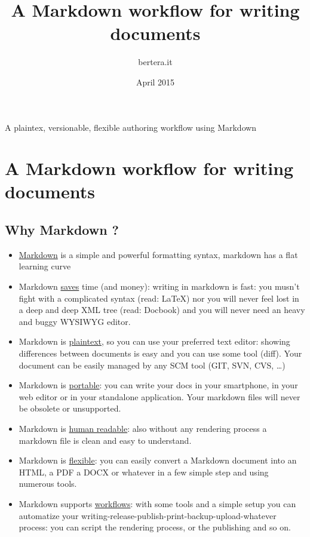 \documentclass[	DIV=calc,%
							paper=a4,%
							fontsize=10pt]{scrartcl}	 					%
\title{A Markdown workflow for writing documents}
\author{bertera.it}
\date{April 2015}
\renewenvironment{abstract}
  {\begin{tcolorbox}[colframe=myblue,colback=mygraylight]}
  {\end{tcolorbox}}
\begin{document}
\maketitle
\begin{abstract}
A plaintex, versionable, flexible authoring workflow using Markdown
\end{abstract}


\thispagestyle{fancy} 			%

\section{A Markdown workflow for writing
documents}\label{a-markdown-workflow-for-writing-documents}

\subsection{Why Markdown ?}\label{why-markdown}

\begin{itemize}
\item
  \href{http://en.wikipedia.org/wiki/Markdown}{Markdown} is a simple and
  powerful formatting syntax, markdown has a flat learning curve
\item
  Markdown
  \href{http://brettterpstra.com/2011/08/31/why-markdown-a-two-minute-explanation/}{saves}
  time (and money): writing in markdown is fast: you musn't fight with a
  complicated syntax (read: LaTeX) nor you will never feel lost in a
  deep and deep XML tree (read: Docbook) and you will never need an
  heavy and buggy WYSIWYG editor.
\item
  Markdown is
  \href{https://help.github.com/articles/markdown-basics/}{plaintext},
  so you can use your preferred text editor: showing differences between
  documents is easy and you can use some tool (diff). Your document can
  be easily managed by any SCM tool (GIT, SVN, CVS, \ldots{})
\item
  Markdown is
  \href{http://mashable.com/2013/06/24/markdown-tools/}{portable}: you
  can write your docs in your smartphone, in your web editor or in your
  standalone application. Your markdown files will never be obsolete or
  unsupported.
\item
  Markdown is \href{https://stackedit.io/}{human readable}: also without
  any rendering process a markdown file is clean and easy to understand.
\item
  Markdown is \href{http://pandoc.org/}{flexible}: you can easily
  convert a Markdown document into an HTML, a PDF a DOCX or whatever in
  a few simple step and using numerous tools.
\item
  Markdown supports
  \href{http://programminghistorian.org/lessons/sustainable-authorship-in-plain-text-using-pandoc-and-markdown}{workflows}:
  with some tools and a simple setup you can automatize your
  writing-release-publish-print-backup-upload-whatever process: you can
  script the rendering process, or the publishing and so on.
\end{itemize}
\end{document}
